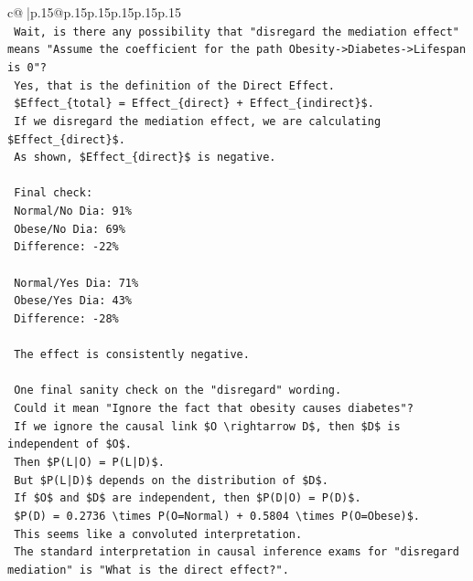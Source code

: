\documentclass{article}
\begin{document}
{\begin{supertabular}{c@{$\;$}|p{.15\linewidth}@{}p{.15\linewidth}p{.15\linewidth}p{.15\linewidth}p{.15\linewidth}p{.15\linewidth}}
{{{\\ 
\texttt{    Wait, is there any possibility that "disregard the mediation effect" means "Assume the coefficient for the path Obesity{-}>Diabetes{-}>Lifespan is 0"?} \\
\texttt{    Yes, that is the definition of the Direct Effect.} \\
\texttt{    \$Effect\_\{total\} = Effect\_\{direct\} + Effect\_\{indirect\}\$.} \\
\texttt{    If we disregard the mediation effect, we are calculating \$Effect\_\{direct\}\$.} \\
\texttt{    As shown, \$Effect\_\{direct\}\$ is negative.} \\
\\ 
\texttt{    Final check:} \\
\texttt{    Normal/No Dia: 91\%} \\
\texttt{    Obese/No Dia: 69\%} \\
\texttt{    Difference: {-}22\%} \\
\\ 
\texttt{    Normal/Yes Dia: 71\%} \\
\texttt{    Obese/Yes Dia: 43\%} \\
\texttt{    Difference: {-}28\%} \\
\\ 
\texttt{    The effect is consistently negative.} \\
\\ 
\texttt{    One final sanity check on the "disregard" wording.} \\
\texttt{    Could it mean "Ignore the fact that obesity causes diabetes"?} \\
\texttt{    If we ignore the causal link \$O \textbackslash{}rightarrow D\$, then \$D\$ is independent of \$O\$.} \\
\texttt{    Then \$P(L|O) = P(L|D)\$.} \\
\texttt{    But \$P(L|D)\$ depends on the distribution of \$D\$.} \\
\texttt{    If \$O\$ and \$D\$ are independent, then \$P(D|O) = P(D)\$.} \\
\texttt{    \$P(D) = 0.2736 \textbackslash{}times P(O=Normal) + 0.5804 \textbackslash{}times P(O=Obese)\$.} \\
\texttt{    This seems like a convoluted interpretation.} \\
\texttt{    The standard interpretation in causal inference exams for "disregard mediation" is "What is the direct effect?".} \\
}}}
\end{supertabular}}
\end{document}
